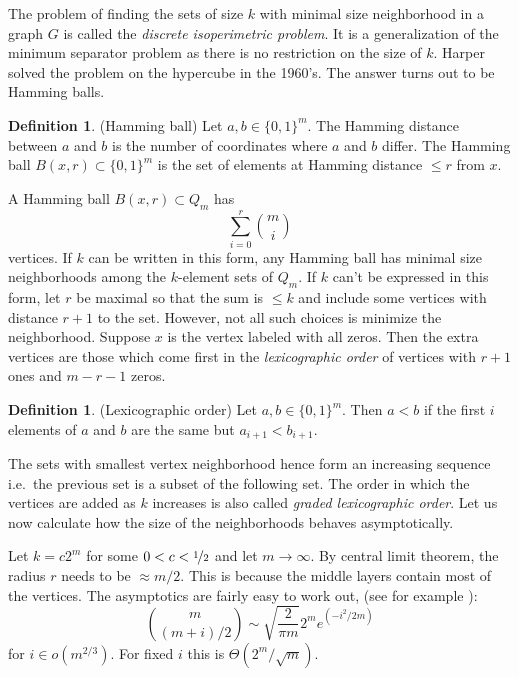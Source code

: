 \documentclass[a4paper,12pt]{book}
\theoremstyle{plain}
\theoremstyle{definition}
\newtheorem{definition}[theorem]{Definition}
\begin{document}
The problem of finding the sets of size $k$ with minimal size neighborhood in a graph $G$ is 
called the \textit{discrete isoperimetric problem}. It is a generalization of 
the minimum separator problem as there is no restriction on the size of $k$. 
Harper \cite{Harp} solved the problem on the hypercube in the 1960's. The 
answer turns out to be Hamming balls.

\begin{definition}
 (Hamming ball) Let $a,b \in \{0,1\}^m$. The Hamming distance between $a$ and 
$b$ is the number of coordinates where $a$ and $b$ differ. The Hamming ball 
$B(x,r) \subset \{0,1\}^m$ is the set of elements at Hamming distance $\leq r$ from $x$.
\end{definition}

A Hamming ball $B(x,r) \subset Q_m$ has 
\begin{equation}
 \sum_{i=0}^r {m \choose i}
\end{equation}
vertices. If $k$ can be written in this form, any Hamming ball has minimal size neighborhoods 
among the $k$-element sets of $Q_m$. 
If $k$ can't be expressed in this form, let $r$ be maximal so that 
the sum is $\leq k$ and include some vertices with distance $r+1$ to the set. 
However, not all such choices is minimize the neighborhood. Suppose $x$ is the vertex labeled with 
all zeros. Then the extra vertices are those which come first in the
\textit{lexicographic order} of vertices with $r+1$ ones and $m-r-1$ zeros.
\begin{definition}
 (Lexicographic order) Let $a,b \in \{0,1\}^m$. Then $a<b$ if the first $i$ 
elements of $a$ and $b$ are the same but $a_{i+1} < b_{i+1}$.
\end{definition}
The sets with smallest vertex neighborhood hence form an increasing sequence i.e.\ 
the previous set is a subset of the following set. The order in which the 
vertices are added as $k$ increases is also called \textit{graded lexicographic 
order}. Let us now calculate how the size of the neighborhoods behaves asymptotically.

Let $k = c2^m$ for some $0<c<\nicefrac{1}{2}$ and let $m \rightarrow \infty$. By central limit theorem, 
the radius $r$ needs to be $\approx m/2$. This is because the middle layers contain most of the vertices.
The asymptotics are fairly easy to work out, (see for example \cite{Spencer:Asymptopia}):
\begin{equation}
\binom{m}{(m+i)/2} \sim \sqrt{\frac{2}{\pi m}} 2^m e^{\left(-i^2/2m\right)}  
\end{equation}
for $i \in o(m^{2/3})$. For fixed $i$ this is $\Theta(2^m/\sqrt{m})$.
\end{document}
